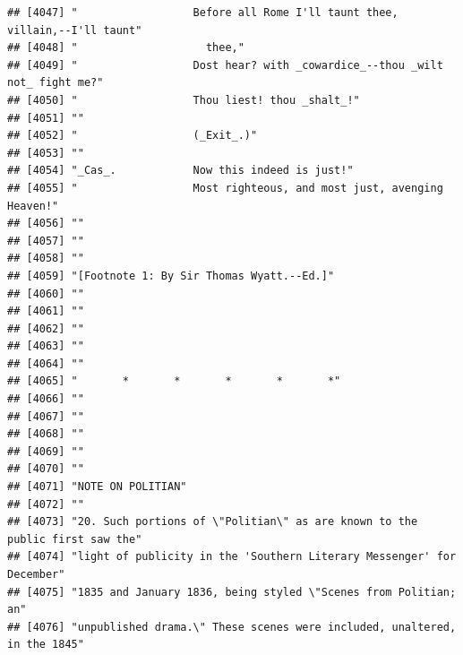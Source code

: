 \documentclass{article}\usepackage[]{graphicx}\usepackage[]{color}
\makeatletter
\newenvironment{kframe}{%
 \def\at@end@of@kframe{}%
 \ifinner\ifhmode%
  \def\at@end@of@kframe{\end{minipage}}%
  \begin{minipage}{\columnwidth}%
 \fi\fi%
 \def\FrameCommand##1{\hskip\@totalleftmargin \hskip-\fboxsep
 \colorbox{shadecolor}{##1}\hskip-\fboxsep
     \hskip-\linewidth \hskip-\@totalleftmargin \hskip\columnwidth}%
 \MakeFramed {\advance\hsize-\width
   \@totalleftmargin\z@ \linewidth\hsize
   \@setminipage}}%
 {\par\unskip\endMakeFramed%
 \at@end@of@kframe}
\newenvironment{knitrout}{}{} %
\makeatother
\begin{document}
\begin{knitrout}
\begin{kframe}
\begin{verbatim}
## [4047] "                  Before all Rome I'll taunt thee, villain,--I'll taunt"     
## [4048] "                    thee,"                                                   
## [4049] "                  Dost hear? with _cowardice_--thou _wilt not_ fight me?"    
## [4050] "                  Thou liest! thou _shalt_!"                                 
## [4051] ""                                                                            
## [4052] "                  (_Exit_.)"                                                 
## [4053] ""                                                                            
## [4054] "_Cas_.            Now this indeed is just!"                                  
## [4055] "                  Most righteous, and most just, avenging Heaven!"           
## [4056] ""                                                                            
## [4057] ""                                                                            
## [4058] ""                                                                            
## [4059] "[Footnote 1: By Sir Thomas Wyatt.--Ed.]"                                     
## [4060] ""                                                                            
## [4061] ""                                                                            
## [4062] ""                                                                            
## [4063] ""                                                                            
## [4064] ""                                                                            
## [4065] "       *       *       *       *       *"                                    
## [4066] ""                                                                            
## [4067] ""                                                                            
## [4068] ""                                                                            
## [4069] ""                                                                            
## [4070] ""                                                                            
## [4071] "NOTE ON POLITIAN"                                                            
## [4072] ""                                                                            
## [4073] "20. Such portions of \"Politian\" as are known to the public first saw the"  
## [4074] "light of publicity in the 'Southern Literary Messenger' for December"        
## [4075] "1835 and January 1836, being styled \"Scenes from Politian; an"              
## [4076] "unpublished drama.\" These scenes were included, unaltered, in the 1845"     

\end{verbatim}
\end{kframe}
\end{knitrout}
\end{document}
